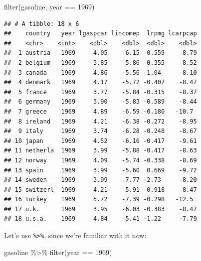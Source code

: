 \documentclass[
]{article}
\newenvironment{Shaded}{\begin{snugshade}}{\end{snugshade}}
\newcommand{\DecValTok}[1]{\textcolor[rgb]{0.00,0.00,0.81}{#1}}
\newcommand{\FunctionTok}[1]{\textcolor[rgb]{0.00,0.00,0.00}{#1}}
\newcommand{\NormalTok}[1]{#1}
\newcommand{\SpecialCharTok}[1]{\textcolor[rgb]{0.00,0.00,0.00}{#1}}
\begin{document}
\begin{Shaded}
\begin{Highlighting}[]
\FunctionTok{filter}\NormalTok{(gasoline, year }\SpecialCharTok{==} \DecValTok{1969}\NormalTok{)}
\end{Highlighting}
\end{Shaded}

\begin{verbatim}
## # A tibble: 18 x 6
##    country   year lgaspcar lincomep  lrpmg lcarpcap
##    <chr>    <int>    <dbl>    <dbl>  <dbl>    <dbl>
##  1 austria   1969     4.05    -6.15 -0.559    -8.79
##  2 belgium   1969     3.85    -5.86 -0.355    -8.52
##  3 canada    1969     4.86    -5.56 -1.04     -8.10
##  4 denmark   1969     4.17    -5.72 -0.407    -8.47
##  5 france    1969     3.77    -5.84 -0.315    -8.37
##  6 germany   1969     3.90    -5.83 -0.589    -8.44
##  7 greece    1969     4.89    -6.59 -0.180   -10.7 
##  8 ireland   1969     4.21    -6.38 -0.272    -8.95
##  9 italy     1969     3.74    -6.28 -0.248    -8.67
## 10 japan     1969     4.52    -6.16 -0.417    -9.61
## 11 netherla  1969     3.99    -5.88 -0.417    -8.63
## 12 norway    1969     4.09    -5.74 -0.338    -8.69
## 13 spain     1969     3.99    -5.60  0.669    -9.72
## 14 sweden    1969     3.99    -7.77 -2.73     -8.20
## 15 switzerl  1969     4.21    -5.91 -0.918    -8.47
## 16 turkey    1969     5.72    -7.39 -0.298   -12.5 
## 17 u.k.      1969     3.95    -6.03 -0.383    -8.47
## 18 u.s.a.    1969     4.84    -5.41 -1.22     -7.79
\end{verbatim}

Let's use \texttt{\%\textgreater{}\%}, since we're familiar with it now:

\begin{Shaded}
\begin{Highlighting}[]
\NormalTok{gasoline }\SpecialCharTok{\%\textgreater{}\%}
  \FunctionTok{filter}\NormalTok{(year }\SpecialCharTok{==} \DecValTok{1969}\NormalTok{)}
\end{Highlighting}
\end{Shaded}
\end{document}
